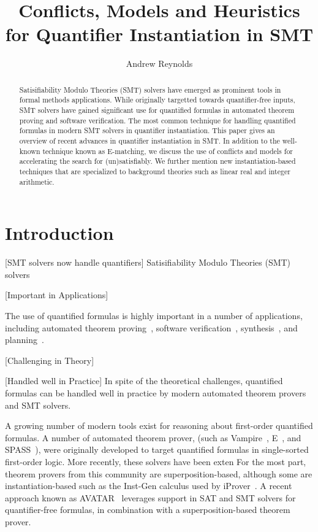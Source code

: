 \documentclass[oribibl]{llncs}
\begin{document}
\title{Conflicts, Models and Heuristics for Quantifier Instantiation in SMT}

\author {Andrew Reynolds}

\maketitle

\pagestyle{plain}

\begin{abstract}
Satisifiability Modulo Theories (SMT) solvers have
emerged as prominent tools in formal methods applications.
While originally targetted towards quantifier-free inputs,
SMT solvers have gained significant use for quantified formulas in automated
theorem proving and software verification.
The most common technique for handling quantified formulas in modern SMT solvers
in quantifier instantiation.
This paper gives an overview of recent advances in quantifier instantiation in SMT.
In addition to the well-known technique known as E-matching,
we discuss the use of conflicts and models for 
accelerating the search for (un)satisfiably.
We further mention new instantiation-based techniques
that are specialized to background theories such as linear real and integer arithmetic.
\end{abstract}

\section{Introduction}

[SMT solvers now handle quantifiers]
Satisifiability Modulo Theories (SMT) solvers 

[Important in Applications]

The use of quantified formulas is highly important in a number of applications,
including automated theorem proving~\cite{}, software verification~\cite{}, synthesis~\cite{}, and planning~\cite{}.

[Challenging in Theory]


[Handled well in Practice]
In spite of the theoretical challenges, quantified formulas
can be handled well in practice by modern automated theorem provers and SMT solvers.


A growing number of modern tools exist for reasoning about first-order quantified formulas.
A number of automated theorem prover,
(such as Vampire~\cite{}, E~\cite{}, and SPASS~\cite{}), were originally developed to target 
quantified formulas in single-sorted first-order logic.
More recently, these solvers have been exten
For the most part, theorem provers from this community are superposition-based,
although some are instantiation-based such as the Inst-Gen calculus used by iProver~\cite{}.
A recent approach known as AVATAR~\cite{} leverages support in SAT and SMT solvers for quantifier-free formulas,
in combination with a superposition-based theorem prover.
\end{document}
